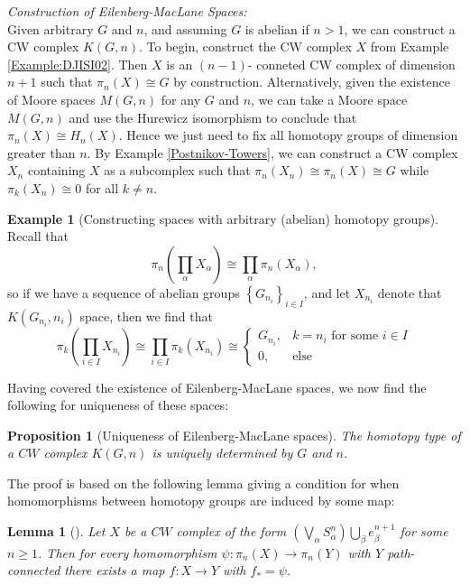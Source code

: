 \documentclass[reqno]{amsart}
\newtheorem{lemma}[theorem]{Lemma}
\newtheorem{proposition}[theorem]{Proposition}
\theoremstyle{definition}
\newtheorem{example}[theorem]{Example}
\theoremstyle{remark}
\begin{document}
\textit{Construction of Eilenberg-MacLane Spaces:}\\
Given arbitrary $G$ and $n$, and assuming $G$ is abelian
if $n>1$, we can construct a CW complex
$K(G,n)$. To begin, construct the
CW complex $X$ from Example \ref{Example:DJISI02}. Then
$X$ is an $(n-1) $- conneted CW complex of dimension
$n+1$ such that $\pi_n (X) \cong G$ by construction. 
Alternatively, given the existence of Moore spaces
$M(G,n)$ for any $G$ and $n$, we can take a Moore space
$M(G,n)$ and use the Hurewicz isomorphism
to conclude that $\pi_n (X) \cong H_n(X)$.
Hence
we just need to fix all homotopy groups of dimension
greater than $n$. By
Example \ref{Postnikov-Towers}, we can
construct a CW complex $X_n$ containing $X$ as a subcomplex
such that
$\pi_n (X_n) \cong \pi_n (X) \cong G$ while
$\pi_k(X_n) \cong 0$ for all $k \neq  n$.


\begin{example}[Constructing spaces with arbitrary
    (abelian) homotopy groups]
    Recall that
    \[
    \pi_n \left( \prod_{\alpha}X_{\alpha} \right) 
    \cong \prod_{\alpha} \pi_n \left( X_{\alpha} \right) ,
    \] 
    so if we have a sequence
    of abelian groups $\left\{ G_{n_i} \right\}_{i \in I}$, and let
    $X_{n_i}$ denote that $K(G_{n_i}, n_{i})$ space, then
    we find that
    \[
    \pi_k( \prod_{i \in I} X_{n_i})
    \cong \prod_{i \in I} \pi_k \left( X_{n_i} \right) 
    \cong \begin{cases}
        G_{n_i},& k = n_{i} \text{ for some }i \in I\\
        0,& \text{else}
    \end{cases}
    \] 
\end{example}

Having covered the existence of Eilenberg-MacLane spaces, we
now find the following for uniqueness of these spaces:

\begin{proposition}[Uniqueness of Eilenberg-MacLane spaces]\label{Prop:23SUIHD}
    The homotopy type of a $CW$ complex
    $K(G,n)$ is uniquely determined by $G$ and $n$.
\end{proposition}

The proof is based on the following
lemma giving a condition for when homomorphisms
between homotopy groups are induced by some
map:

\begin{lemma}[]\label{Lemma:NDWUAI288}
    Let $X$ be a $CW$ complex of the form
    $\left( \bigvee_{\alpha} S_{\alpha}^{n} \right) 
    \bigcup_{\beta} e_{\beta}^{n+1}$ for some $n\ge 1$.
    Then for every homomorphism $\psi \colon
    \pi_n (X) \to \pi_n (Y)$ with $Y$ path-connected
    there exists a map $f \colon X \to Y$ with
    $f_* = \psi $.
\end{lemma}
\end{document}
